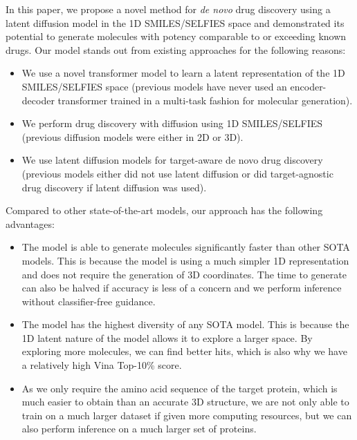\documentclass[11pt]{article}
\begin{document}
In this paper, we propose a novel method for 
\textit{de novo} drug discovery using a latent diffusion model in the 1D SMILES/SELFIES space
and demonstrated its potential to generate molecules with potency comparable to or exceeding known drugs. 
Our model stands out from existing approaches for the following reasons:
\begin{itemize}
    \item We use a novel transformer model to learn a latent representation
          of the 1D SMILES/SELFIES space (previous models have never used an 
          encoder-decoder transformer trained in a multi-task fashion for 
          molecular generation).
    \item We perform drug discovery with diffusion using 1D SMILES/SELFIES 
          (previous diffusion models were either in 2D or 3D).
    \item We use latent diffusion models for target-aware de novo drug discovery
          (previous models either did not use latent diffusion or did target-agnostic 
          drug discovery if latent diffusion was used).
\end{itemize}

Compared to other state-of-the-art models, our approach has the following advantages:
\begin{itemize}
    \item The model is able to generate molecules significantly faster than other SOTA models.
          This is because the model is using a much simpler 1D representation and 
          does not require the generation of 3D coordinates. 
          The time to generate can also be halved if accuracy is less of a concern and we perform 
          inference without classifier-free guidance.
    \item The model has the highest diversity of any SOTA model. This is because the 1D latent nature 
          of the model allows it to explore a larger space. By exploring more molecules, we can 
          find better hits, which is also why we have a relatively high Vina Top-10\% score.
    \item As we only require the amino acid sequence of the target protein, which is much easier to 
          obtain than an accurate 3D structure, we are not only able to train on a much larger dataset 
          if given more computing resources, but we can also perform inference on a much larger set of 
          proteins.
\end{itemize}
\end{document}
